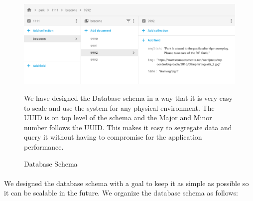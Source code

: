 \documentclass[12pt]{article}
\begin{document}
\begin{figure}[H]
	\centering
	\includegraphics[width=1\linewidth]{media/db.png}
	\caption{Database Schema}{We have designed the Database schema in a way that it is very easy to scale and use the system for any physical environment. The UUID is on top level of the schema and the Major and Minor number follows the UUID. This makes it easy to segregate data and query it without having to compromise for the application performance.}
	\label{fig:db}
\end{figure} 

\paragraph{} We designed the database schema with a goal to keep it as simple as possible so it can be scalable in the future. We organize the database schema as follows:
\end{document}
